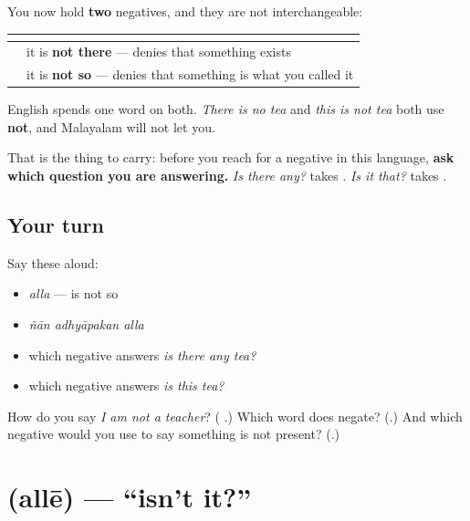 \begin{grammarlens}[title={Grammar Lens: Malayalam negates twice, and English only once}]
You now hold \textbf{two} negatives, and they are not interchangeable:

\noindent
\begin{tabularx}{\linewidth}{@{}>{\raggedright\arraybackslash}X>{\raggedright\arraybackslash}X@{}}
\toprule
\textbf{} & \textbf{} \\
\midrule
\textbf{\ml{ഇല്ല}} & it is \textbf{not there} — denies that something exists \\
\textbf{\ml{അല്ല}} & it is \textbf{not so} — denies that something is what you called it \\
\bottomrule
\end{tabularx}

English spends one word on both. \emph{There is no tea} and \emph{this is not tea} both use \textbf{not}, and Malayalam will not let you.

That is the thing to carry: before you reach for a negative in this language, \textbf{ask which question you are answering.} \emph{Is there any?} takes . \emph{Is it that?} takes .
\end{grammarlens}

\subsection*{Your turn}
Say these aloud:

\begin{itemize}
\raggedright
  \item \emph{alla} — is not so
  \item \emph{ñān adhyāpakan alla}
  \item which negative answers \emph{is there any tea?}
  \item which negative answers \emph{is this tea?}
\end{itemize}

\begin{tcolorbox}[breakable,colback=teal!4,colframe=teal!35!black,title={Before you move on}]
How do you say \emph{I am not a teacher}? (\emph{\textbf{  }}.) Which word does  negate? (\emph{\textbf{}}.) And which negative would you use to say something is not present? (\emph{\textbf{}}.)
\end{tcolorbox}
\section[\texorpdfstring{\ml{അല്ലേ} (allē)}{അല്ലേ (allē)}]{ (allē) — \textquotedblleft{}isn't it?\textquotedblright{}}

